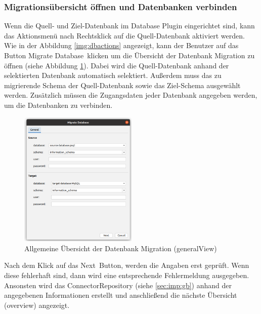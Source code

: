 \subsubsection{Migrationsübersicht öffnen und Datenbanken verbinden}	
Wenn die Quell- und Ziel-Datenbank im Database Plugin eingerichtet sind, kann das Aktionsmenü nach Rechtsklick auf die Quell-Datenbank aktiviert werden. Wie in der Abbildung \ref{img:dbactions} angezeigt, kann der Benutzer auf das Button \glqq Migrate Database\grqq \, klicken um die Übersicht der Datenbank Migration zu öffnen (siehe Abbildung \ref{img:ui:generalView}). Dabei wird die Quell-Datenbank anhand der selektierten Datenbank automatisch selektiert. Außerdem muss das zu migrierende Schema der Quell-Datenbank sowie das Ziel-Schema ausgewählt werden. Zusätzlich müssen die Zugangsdaten jeder Datenbank angegeben werden, um die Datenbanken zu verbinden.
\begin{figure}[h]
	\centering
	\includegraphics[width=0.5\textwidth]{images/ui/generalView}
	\caption{Allgemeine Übersicht der Datenbank Migration (generalView)}
	\label{img:ui:generalView}
\end{figure}
Nach dem Klick auf das \glqq Next\grqq \, Button, werden die Angaben erst geprüft. Wenn diese fehlerhaft sind, dann wird eine entsprechende Fehlermeldung ausgegeben. Ansonsten wird das ConnectorRepository (siehe \ref{sec:imp:gb}) anhand der angegebenen Informationen erstellt und anschließend die nächste Übersicht (overview) angezeigt.


